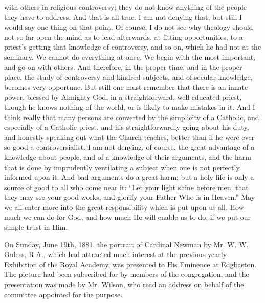 with others in religious controversy; they do not know anything of the
people they have to address. And that is all true. I am not denying
that; but still I would say one thing on that point. Of course, I do
not see why theology should not so far open the mind as to lead
afterwards, at fitting opportunities, to a priest's getting that
knowledge of controversy, and so on, which he had not at the seminary.
We cannot do everything at once. We begin with the most important, and
go on with others. And therefore, in the proper time, and in the
proper place, the study of controversy and kindred subjects, and of
secular knowledge, becomes very opportune. But still one must remember
that there is an innate power, blessed by Almighty God, in a
straightforward, well-educated priest, though he knows nothing of the
world, or is likely to make mistakes in it. And I think really that
many persons are converted by the simplicity of a Catholic, and
especially of a Catholic priest, and his straightforwardly going about
his duty, and honestly speaking out what the Church teaches, better
than if he were ever so good a controversialist. I am not denying, of
course, the great advantage of a knowledge about people, and of a
knowledge of their arguments, and the harm that is done by imprudently
ventilating a subject when one is not perfectly informed upon it. And
bad arguments do a great harm; but a holy life is only a source of
good to all who come near it: ``Let your light shine before men, that
they may see your good works, and glorify your Father Who is in
Heaven.'' May we all enter more into the great responsibility which is
put upon us all. How much we can do for God, and how much He will
enable us to do, if we put our simple trust in Him.


On
Sunday, June 19th, 1881, the portrait of Cardinal Newman by Mr. W. W.
Ouless, R.A., which had attracted much interest at the previous yearly
Exhibition of the Royal Academy, was presented to His Eminence at
Edgbaston. The picture had been subscribed for by members of the
congregation, and the presentation was made by Mr. Wilson, who read an
address on behalf of the committee appointed for the purpose.

